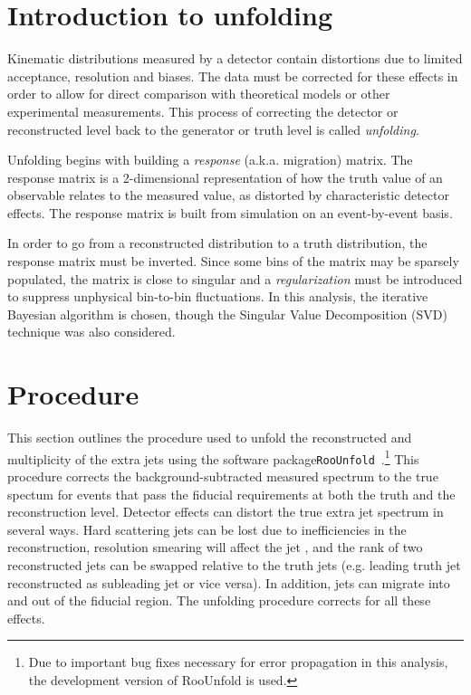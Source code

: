 \section{Introduction to unfolding}
Kinematic distributions measured by a detector contain distortions due to limited acceptance, resolution and biases. The data must be corrected for these effects in order to allow for direct comparison with theoretical models or other experimental measurements. This process of correcting the detector or reconstructed level back to the generator or truth level is called \emph{unfolding}.


Unfolding begins with building a \emph{response} (a.k.a. migration) matrix. The response matrix is a 2-dimensional representation of how the truth value of an observable relates to the measured value, as distorted by characteristic detector effects. The response matrix is built from simulation on an event-by-event basis.

In order to go from a reconstructed distribution to a truth distribution, the response matrix must be inverted. Since some bins of the matrix may be sparsely populated, the matrix is close to singular and a \emph{regularization} must be introduced to suppress unphysical bin-to-bin fluctuations. In this analysis, the iterative Bayesian algorithm is chosen, though the Singular Value Decomposition (SVD) technique was also considered.

\section{Procedure}
This section outlines the procedure used to unfold the reconstructed \pt and multiplicity of the 
extra jets using the software package\texttt{RooUnfold}~\cite{roounfold}.\footnote{Due to important bug fixes necessary for error propagation in this analysis, the development version of RooUnfold is used.}
This procedure corrects the background-subtracted measured spectrum to the true
spectum for events that pass the fiducial requirements at both the truth and the reconstruction level.
Detector effects can distort the true extra jet spectrum in several ways.  Hard scattering jets can be lost due to
inefficiencies in the reconstruction, resolution smearing will affect the jet \pt, and the rank of two
reconstructed jets can be swapped relative to the truth jets  (e.g. leading truth jet reconstructed as subleading jet or vice versa).
In addition, jets can migrate  into and out of the fiducial region.  The unfolding procedure corrects for all these effects.


